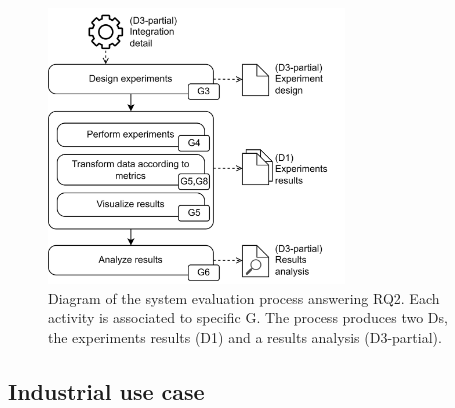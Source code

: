 \begin{figure}[!ht]
    \begin{center}
    \includegraphics[width=0.7\textwidth]{figures/3-method/method_exp.png}
    \caption[System evaluation process - Hudi vs. Iceberg]{Diagram of the system evaluation process answering \gls{RQ}2. Each activity is associated to specific \gls{G}. The process produces two \glspl{D}, the experiments results (\gls{D}1) and a results analysis (\gls{D}3-partial).}
    \label{fig:method_experiments}
    \end{center}
\end{figure}


\subsection{Industrial use case}
\label{subsec:method_use_case}

